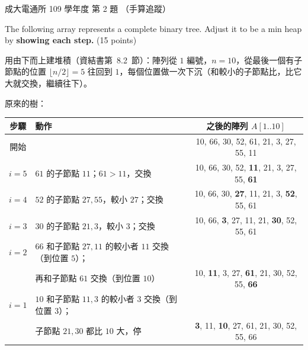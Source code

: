 \begin{pastexam}[label={px:ncku-109-comm-ds-02}]{成大電通所 109 學年度 第 2 題}
（手算追蹤）

The following array represents a complete binary tree. Adjust it to be a min heap by
\textbf{showing each step.} (15 points)

\begin{center}
\end{center}
\end{pastexam}

\begin{pastsoln}
用由下而上建堆積（資結書第~8.2~節）：陣列從 $1$ 編號，$n = 10$，從最後一個有子節點的位置
$\lfloor n/2 \rfloor = 5$ 往回到 $1$，每個位置做一次下沉（和較小的子節點比，比它大就交換，繼續往下）。

原來的樹：
\begin{center}
\end{center}

\begin{center}
\small
\begin{tabular}{clc}
\toprule
步驟 & 動作 & 之後的陣列 $A[1..10]$ \\
\midrule
開始 & & 10, 66, 30, 52, 61, 21, 3, 27, 55, 11 \\
$i = 5$ & $61$ 的子節點 $11$；$61 > 11$，交換 & 10, 66, 30, 52, \textbf{11}, 21, 3, 27, 55, \textbf{61} \\
$i = 4$ & $52$ 的子節點 $27, 55$，較小 $27$；交換 & 10, 66, 30, \textbf{27}, 11, 21, 3, \textbf{52}, 55, 61 \\
$i = 3$ & $30$ 的子節點 $21, 3$，較小 $3$；交換 & 10, 66, \textbf{3}, 27, 11, 21, \textbf{30}, 52, 55, 61 \\
$i = 2$ & $66$ 和子節點 $27, 11$ 的較小者 $11$ 交換（到位置 $5$）； & \\
 & \quad 再和子節點 $61$ 交換（到位置 $10$） & 10, \textbf{11}, 3, 27, \textbf{61}, 21, 30, 52, 55, \textbf{66} \\
$i = 1$ & $10$ 和子節點 $11, 3$ 的較小者 $3$ 交換（到位置 $3$）； & \\
 & \quad 子節點 $21, 30$ 都比 $10$ 大，停 & \textbf{3}, 11, \textbf{10}, 27, 61, 21, 30, 52, 55, 66 \\
\bottomrule
\end{tabular}
\end{center}


\end{pastsoln}

